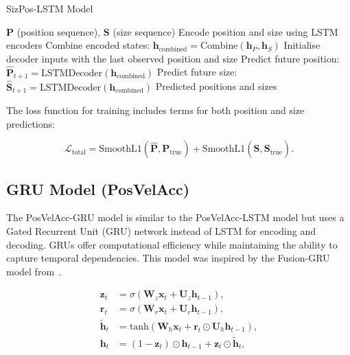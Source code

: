 \documentclass[12pt,oneside]{book} %
\begin{document}
\begin{algorithm}
    \caption{SizPos-LSTM Model}\label{alg:lstm_sizpos}
    \begin{algorithmic}[1]
        \Require $\mathbf{P}$ (position sequence), $\mathbf{S}$ (size sequence)
        \State Encode position and size using LSTM encoders
        \State Combine encoded states: $\mathbf{h}_{\text{combined}} = \text{Combine}(\mathbf{h}_P, \mathbf{h}_S)$
        \State Initialise decoder inputs with the last observed position and size
         
        \State Predict future position: $\hat{\mathbf{P}}_{t+1} = \text{LSTMDecoder}(\mathbf{h}_{\text{combined}})$
        \State Predict future size: $\hat{\mathbf{S}}_{t+1} = \text{LSTMDecoder}(\mathbf{h}_{\text{combined}})$
        \EndFor
        \State \Return Predicted positions and sizes
    \end{algorithmic}
\end{algorithm}

The loss function for training includes terms for both position and size
predictions:

\begin{equation}
    \mathcal{L}_{\text{total}} = \text{SmoothL1}(\hat{\mathbf{P}}, \mathbf{P}_{\text{true}}) + \text{SmoothL1}(\hat{\mathbf{S}}, \mathbf{S}_{\text{true}}).
\end{equation}

\newpage
\subsection*{GRU Model (PosVelAcc)}
\noindent The PosVelAcc-GRU model is similar to the PosVelAcc-LSTM model but uses a Gated
Recurrent Unit (GRU) network instead of LSTM for encoding and decoding. GRUs
offer computational efficiency while maintaining the ability to capture
temporal dependencies. This model was inspired by the Fusion-GRU model
from~\citet{FusionGRU}.

\begin{align}
    \mathbf{z}_t         & = \sigma(\mathbf{W}_z \mathbf{x}_t + \mathbf{U}_z \mathbf{h}_{t-1}),                         \\
    \mathbf{r}_t         & = \sigma(\mathbf{W}_r \mathbf{x}_t + \mathbf{U}_r \mathbf{h}_{t-1}),                         \\
    \mathbf{\tilde{h}}_t & = \text{tanh}(\mathbf{W}_h \mathbf{x}_t + \mathbf{r}_t \odot \mathbf{U}_h \mathbf{h}_{t-1}), \\
    \mathbf{h}_t         & = (1 - \mathbf{z}_t) \odot \mathbf{h}_{t-1} + \mathbf{z}_t \odot \mathbf{\tilde{h}}_t,
\end{align}
\end{document}
